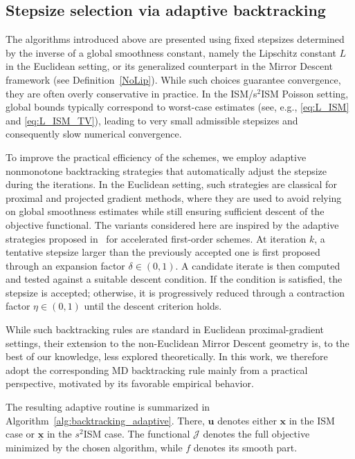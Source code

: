 \documentclass[letterpaper]{article}
\begin{document}
\subsection{Stepsize selection via adaptive backtracking}
\label{backtracking}

The algorithms introduced above are presented using fixed stepsizes determined by the inverse of a global smoothness constant, namely the Lipschitz constant $L$ in the Euclidean setting, or its generalized counterpart in the Mirror Descent framework (see Definition~\ref{NoLip}). While such choices guarantee convergence, they are often overly conservative in practice. In the ISM/s$^2$ISM Poisson setting, global bounds typically correspond to worst-case estimates (see, e.g., \eqref{eq:L_ISM} and \eqref{eq:L_ISM_TV}), leading to very small admissible stepsizes and consequently slow numerical convergence.

To improve the practical efficiency of the schemes, we employ adaptive nonmonotone backtracking strategies that automatically adjust the stepsize during the iterations. In the Euclidean setting, such strategies are classical for proximal and projected gradient methods, where they are used to avoid relying on global smoothness estimates while still ensuring sufficient descent of the objective functional. The variants considered here are inspired by the adaptive strategies proposed in~\cite{CalatroniChambolle2019,RebegoldiCalatroni2022} for accelerated first-order schemes. At iteration $k$, a tentative stepsize larger than the previously accepted one is first proposed through an expansion factor $\delta\in(0,1)$. A candidate iterate is then computed and tested against a suitable descent condition. If the condition is satisfied, the stepsize is accepted; otherwise, it is progressively reduced through a contraction factor $\eta\in(0,1)$ until the descent criterion holds.

While such backtracking rules are standard in Euclidean proximal-gradient settings, their extension to the non-Euclidean Mirror Descent geometry is, to the best of our knowledge, less explored theoretically. In this work, we therefore adopt the corresponding MD backtracking rule mainly from a practical perspective, motivated by its favorable empirical behavior.

The resulting adaptive routine is summarized in Algorithm~\ref{alg:backtracking_adaptive}. There, $\mathbf u$ denotes either $\mathbf x$ in the ISM case or $\underline{\mathbf x}$ in the $s^2$ISM case. The functional $\mathcal J$ denotes the full objective minimized by the chosen algorithm, while $f$ denotes its smooth part.
\end{document}
